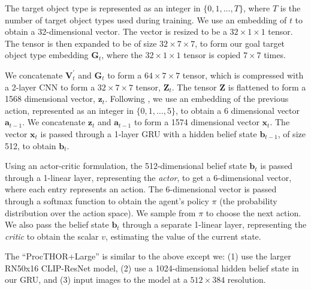 The target object type is represented as an integer in $\{0, 1, \ldots, T\}$, where $T$ is the number of target object types used during training. We use an embedding of $t$ to obtain a 32-dimensional vector. The vector is resized to be a $32\times1\times1$ tensor. The tensor is then expanded to be of size $32\times7\times7$, to form our goal target object type embedding $\mathbf G_t$, where the $32\times1\times1$ tensor is copied $7\times7$ times.

We concatenate $\mathbf V^\prime_t$ and $\mathbf G_t$ to form a $64\times7\times7$ tensor, which is compressed with a 2-layer CNN to form a $32\times7\times7$ tensor, $\mathbf Z_t$. The tensor $\mathbf Z$ is flattened to form a 1568 dimensional vector, $\mathbf z_t$. Following \cite{ni2021towards}, we use an embedding of the previous action, represented as an integer in $\{0, 1, \ldots, 5\}$, to obtain a 6 dimensional vector $\mathbf a_{t-1}$. We concatenate $\mathbf z_t$ and $\mathbf a_{t-1}$ to form a 1574 dimensional vector $\mathbf x_t$. The vector $\mathbf x_t$ is passed through a 1-layer GRU \cite{cho2014learning, chung2014empirical} with a hidden belief state $\mathbf b_{t-1}$, of size 512, to obtain $\mathbf b_t$.

Using an actor-critic formulation, the 512-dimensional belief state $\mathbf b_t$ is passed through a 1-linear layer, representing the \textit{actor}, to get a 6-dimensional vector, where each entry represents an action. The 6-dimensional vector is passed through a softmax function to obtain the agent's policy $\pi$ (\ie the probability distribution over the action space). We sample from $\pi$ to choose the next action. We also pass the belief state $\mathbf b_t$ through a separate 1-linear layer, representing the \textit{critic} to obtain the scalar $v$, estimating the value of the current state.

The ``ProcTHOR+Large'' is similar to the above except we: (1) use the larger RN50x16 CLIP-ResNet model, (2) use a 1024-dimensional hidden belief state in our GRU, and (3) input images to the model at a $512{\times}384$ resolution.


